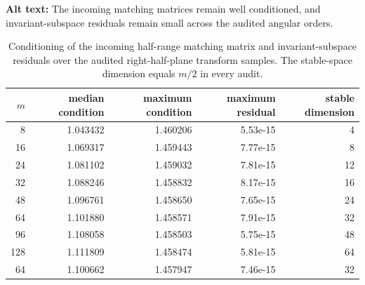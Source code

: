 \begin{table}[ht]
\centering
\caption{Conditioning of the incoming half-range matching matrix and invariant-subspace residuals over the audited right-half-plane transform samples.  The stable-space dimension equals $m/2$ in every audit.}
\par\raggedright\textbf{Alt text:} The incoming matching matrices remain well conditioned, and invariant-subspace residuals remain small across the audited angular orders.\par\centering

\label{tab:conditioning}
\begin{tabular}{rrrrr}
\toprule
$m$ & median condition & maximum condition & maximum residual & stable dimension\\
\midrule
8 & 1.043432 & 1.460206 & 5.53e-15 & 4\\
16 & 1.069317 & 1.459443 & 7.77e-15 & 8\\
24 & 1.081102 & 1.459032 & 7.81e-15 & 12\\
32 & 1.088246 & 1.458832 & 8.17e-15 & 16\\
48 & 1.096761 & 1.458650 & 7.65e-15 & 24\\
64 & 1.101880 & 1.458571 & 7.91e-15 & 32\\
96 & 1.108058 & 1.458503 & 5.75e-15 & 48\\
128 & 1.111809 & 1.458474 & 5.81e-15 & 64\\
64 & 1.100662 & 1.457947 & 7.46e-15 & 32\\
\bottomrule
\end{tabular}
\end{table}
